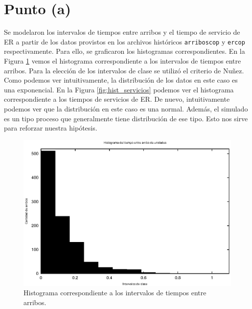 \documentclass[a4paper,10pt]{article}
\begin{document}


\section{Punto (a)}
Se modelaron los intervalos de tiempos entre arribos y el tiempo de servicio de ER a partir de los datos provistos en los archivos históricos \verb|arriboscop| y \verb|ercop| respectivamente. Para ello, se graficaron los histogramas correspondientes. En la Figura \ref{fig:hist_arriboscop} vemos el histograma correspondiente a los intervalos de tiempos entre arribos. Para la elección de los intervalos de clase se utilizó el criterio de Nuñez. Como podemos ver intuitivamente, la distribución de los datos en este caso es una exponencial. En la Figura \ref{fig:hist_servicios} podemos ver el histograma correspondiente a los tiempos de servicios de ER. De nuevo, intuitivamente podemos ver que la distribución en este caso es una normal. Además, el simulado es un tipo proceso que generalmente tiene distribución de ese tipo. Esto nos sirve para reforzar nuestra hipótesis.

\begin{figure}[ht]
\begin{center}
\includegraphics[width=12cm]{../src/parteA/hist_arribos.eps}
\caption{\label{fig:hist_arriboscop} Histograma correspondiente a los intervalos de tiempos entre arribos.}
\end{center}
\end{figure}
\end{document}
